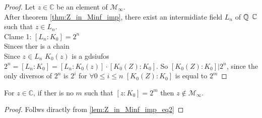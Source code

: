 \begin{proof}  %
    Let $z \in \mathbb{C}$ be an element of  $\mathcal{M}_{\infty}$.\\
    After theorem \ref{thm:Z_in_Minf_imp}, there exist an intermidiate field $L_n$ of $\mathbb{Q}$ $\mathbb{C}$ such that $z\in L_n$.\\
    Clame 1: $[L_n:K_0]= 2^n$\\

    Sinces ther is a chain \\
    Since $z\in L_n$ $K_0(z)$ is a gdsiufos $2^n=[L_n : K_0] = [L_n : K_0(z)] \cdot [K_0(Z):K_0]$.
    So $[K_0(Z):K_0] | 2^n$, since the only diversos of $2^n$ is $2^i$ for $\forall 0\le i \le n$ $[K_0(Z):K_0]$ is equal to $2^m$
\end{proof}

\begin{corollary}
    \label{cor:not_in_M_inf}
    For $z \in \mathbb{C}$, if ther is no $m$ such that $[z:K_0]=2^m$ then $z\notin \mathcal{M}_{\infty}$.
\end{corollary}

\begin{proof}
    Follws diractly from \ref{lem:Z_in_Minf_imp_eq2}
\end{proof}